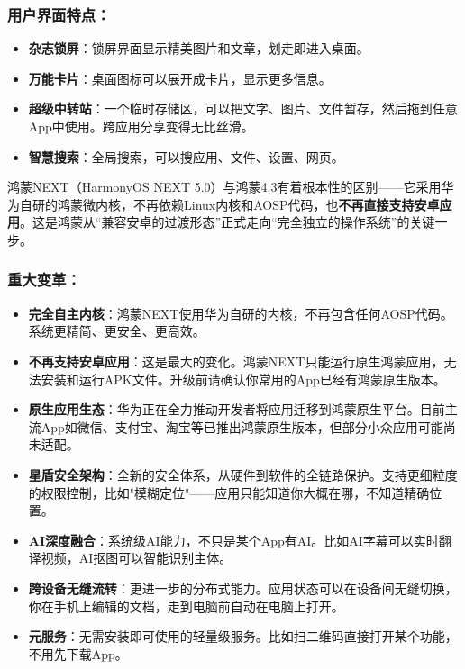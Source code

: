 \subsubsection*{用户界面特点：}

\begin{itemize}
  \item \textbf{杂志锁屏}：锁屏界面显示精美图片和文章，划走即进入桌面。
  \item \textbf{万能卡片}：桌面图标可以展开成卡片，显示更多信息。
  \item \textbf{超级中转站}：一个临时存储区，可以把文字、图片、文件暂存，然后拖到任意App中使用。跨应用分享变得无比丝滑。
  \item \textbf{智慧搜索}：全局搜索，可以搜应用、文件、设置、网页。
\end{itemize}


鸿蒙NEXT（HarmonyOS NEXT 5.0）与鸿蒙4.3有着根本性的区别——它采用华为自研的鸿蒙微内核，不再依赖Linux内核和AOSP代码，也\textbf{不再直接支持安卓应用}。这是鸿蒙从“兼容安卓的过渡形态”正式走向“完全独立的操作系统”的关键一步。

\subsubsection*{重大变革：}

\begin{itemize}
  \item \textbf{完全自主内核}：鸿蒙NEXT使用华为自研的内核，不再包含任何AOSP代码。系统更精简、更安全、更高效。
  \item \textbf{不再支持安卓应用}：这是最大的变化。鸿蒙NEXT只能运行原生鸿蒙应用，无法安装和运行APK文件。升级前请确认你常用的App已经有鸿蒙原生版本。
  \item \textbf{原生应用生态}：华为正在全力推动开发者将应用迁移到鸿蒙原生平台。目前主流App如微信、支付宝、淘宝等已推出鸿蒙原生版本，但部分小众应用可能尚未适配。
  \item \textbf{星盾安全架构}：全新的安全体系，从硬件到软件的全链路保护。支持更细粒度的权限控制，比如"模糊定位"——应用只能知道你大概在哪，不知道精确位置。
  \item \textbf{AI深度融合}：系统级AI能力，不只是某个App有AI。比如AI字幕可以实时翻译视频，AI抠图可以智能识别主体。
  \item \textbf{跨设备无缝流转}：更进一步的分布式能力。应用状态可以在设备间无缝切换，你在手机上编辑的文档，走到电脑前自动在电脑上打开。
  \item \textbf{元服务}：无需安装即可使用的轻量级服务。比如扫二维码直接打开某个功能，不用先下载App。
\end{itemize}

